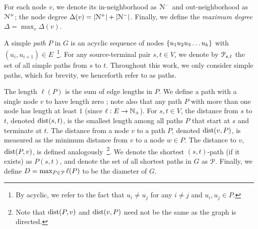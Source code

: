 
For each node $v$, we denote its in-neighborhood as $\Nb$ and out-neighborhood as $\Nf$; the node degree $\Delta(v) = |\Nf|+|\Nb|$.
Finally, we define the \emph{maximum degree} $\Delta = \max_v\Delta(v)$.


A simple \emph{path} $P$ in $G$ is an acyclic sequence of nodes  $\crl*{u_1u_2u_3\ldots u_k}$ with $(u_i,u_{i+1})\in E$~\footnote{By acyclic, we refer to the fact that $u_i\neq u_j$ for any $i\neq j$ and $u_i,u_j\in P$.}. 
For any source-terminal pair $s,t\in V$, we denote by $\calP_{s,t}$ the set of all simple paths from $s$ to $t$.
Throughout this work, we only consider simple paths, which for brevity, we henceforth refer to as paths.

The length $\ell(P)$ is the sum of edge lengths in $P$. We define a path with a single node $v$ to have length zero ; note also that any path $P$ with more than one node has length at least $1$ (since $\ell:E\to \N_+$).
For $s,t\in V$, the distance from $s$ to $t$, denoted $\dist(s,t)$, is the smallest length among all paths $P$ that start at $s$ and terminate at $t$.
The distance from a node $v$ to a path $P$, denoted $\dist(v,P)$, is measured as the minimum distance from $v$ to a node $w\in P$.
The distance to $v$, $\dist(P,v)$, is defined analogously~\footnote{Note that  $\dist(P,v)$ and  $\dist(v,P)$ need not be the same as the graph is directed.}.
We denote the shortest $(s,t)$-path (if it exists) as $P(s,t)$, and denote the set of all shortest paths in $G$ as $\calP$.
Finally, we define $D=\max_{P\in\calP}\ell(P)$ to be the diameter of $G$.


